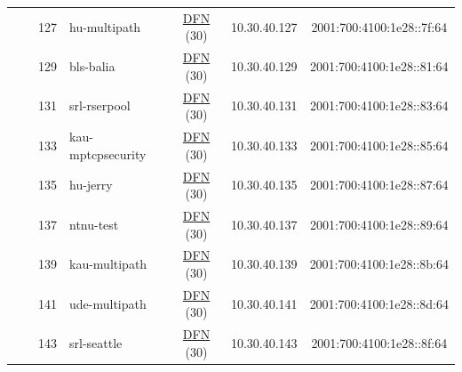 \begin{small}
\begin{center}
\begin{longtable}{|c|c|c|c|c|c|c|c|}
  &  & \tiny{127} & \multicolumn{1}{|l|}{\tiny{hu-multipath}} & \multicolumn{2}{|c|}{\tiny{\href{https://www.dfn.de}{DFN} (30)}} & \tiny{10.30.40.127} & \tiny{2001:700:4100:1e28::7f:64} \\* \cline{3-3}\cline{4-4}\cline{5-5}\cline{6-6}\cline{7-7}\cline{8-8}
  &  & \tiny{129} & \multicolumn{1}{|l|}{\tiny{bls-balia}} & \multicolumn{2}{|c|}{\tiny{\href{https://www.dfn.de}{DFN} (30)}} & \tiny{10.30.40.129} & \tiny{2001:700:4100:1e28::81:64} \\* \cline{3-3}\cline{4-4}\cline{5-5}\cline{6-6}\cline{7-7}\cline{8-8}
  &  & \tiny{131} & \multicolumn{1}{|l|}{\tiny{srl-rserpool}} & \multicolumn{2}{|c|}{\tiny{\href{https://www.dfn.de}{DFN} (30)}} & \tiny{10.30.40.131} & \tiny{2001:700:4100:1e28::83:64} \\* \cline{3-3}\cline{4-4}\cline{5-5}\cline{6-6}\cline{7-7}\cline{8-8}
  &  & \tiny{133} & \multicolumn{1}{|l|}{\tiny{kau-mptcpsecurity}} & \multicolumn{2}{|c|}{\tiny{\href{https://www.dfn.de}{DFN} (30)}} & \tiny{10.30.40.133} & \tiny{2001:700:4100:1e28::85:64} \\* \cline{3-3}\cline{4-4}\cline{5-5}\cline{6-6}\cline{7-7}\cline{8-8}
  &  & \tiny{135} & \multicolumn{1}{|l|}{\tiny{hu-jerry}} & \multicolumn{2}{|c|}{\tiny{\href{https://www.dfn.de}{DFN} (30)}} & \tiny{10.30.40.135} & \tiny{2001:700:4100:1e28::87:64} \\* \cline{3-3}\cline{4-4}\cline{5-5}\cline{6-6}\cline{7-7}\cline{8-8}
  &  & \tiny{137} & \multicolumn{1}{|l|}{\tiny{ntnu-test}} & \multicolumn{2}{|c|}{\tiny{\href{https://www.dfn.de}{DFN} (30)}} & \tiny{10.30.40.137} & \tiny{2001:700:4100:1e28::89:64} \\* \cline{3-3}\cline{4-4}\cline{5-5}\cline{6-6}\cline{7-7}\cline{8-8}
  &  & \tiny{139} & \multicolumn{1}{|l|}{\tiny{kau-multipath}} & \multicolumn{2}{|c|}{\tiny{\href{https://www.dfn.de}{DFN} (30)}} & \tiny{10.30.40.139} & \tiny{2001:700:4100:1e28::8b:64} \\* \cline{3-3}\cline{4-4}\cline{5-5}\cline{6-6}\cline{7-7}\cline{8-8}
  &  & \tiny{141} & \multicolumn{1}{|l|}{\tiny{ude-multipath}} & \multicolumn{2}{|c|}{\tiny{\href{https://www.dfn.de}{DFN} (30)}} & \tiny{10.30.40.141} & \tiny{2001:700:4100:1e28::8d:64} \\* \cline{3-3}\cline{4-4}\cline{5-5}\cline{6-6}\cline{7-7}\cline{8-8}
  &  & \tiny{143} & \multicolumn{1}{|l|}{\tiny{srl-seattle}} & \multicolumn{2}{|c|}{\tiny{\href{https://www.dfn.de}{DFN} (30)}} & \tiny{10.30.40.143} & \tiny{2001:700:4100:1e28::8f:64} \\* \cline{3-3}\cline{4-4}\cline{5-5}\cline{6-6}\cline{7-7}\cline{8-8}

\end{longtable}
\end{center}
\end{small}
